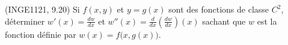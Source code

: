
\begin{exercice}\label{exoDerrivePartielle-0006}

	(INGE1121, 9.20) Si $f(x,y)$ et $y=g(x)$ sont des fonctions de classe $C^2$, déterminer $w'(x)=\frac{ dw }{ dx }$ et $w''(x)=\frac{ d }{ dx }\left( \frac{ dw }{ dx } \right)(x)$ sachant que $w$ est la fonction définie par $w(x)=f\big( x,g(x) \big)$.

\end{exercice}
